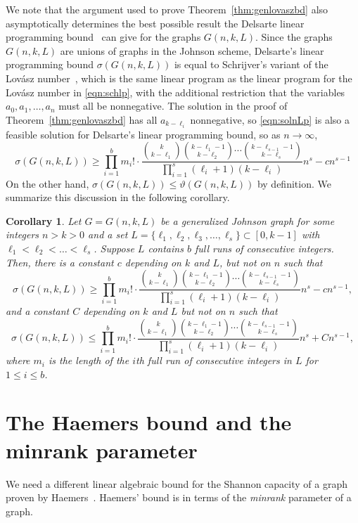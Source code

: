 \documentclass[11pt]{article}
\newtheorem{corollary}[theorem]{Corollary}
\theoremstyle{definition}
\theoremstyle{remark}
\begin{document}
We note that the argument used to prove Theorem~\ref{thm:genlovaszbd} also asymptotically determines the best possible result the Delsarte linear programming bound~\cite{Del1973, Sch1979} can give for the graphs $G(n, k, L)$. Since the graphs $G(n, k, L)$ are unions of graphs in the Johnson scheme, Delsarte's linear programming bound $\sigma(G(n, k, L))$ is equal to Schrijver's variant of the Lov\'asz number~\cite{Sch1979}, which is the same linear program as the linear program for the Lov\'asz number in \eqref{eqn:schlp}, with the additional restriction that the variables $a_{0}, a_{1}, \ldots, a_{n}$ must all be nonnegative. The solution in the proof of Theorem~\ref{thm:genlovaszbd} has all $a_{k-\ell_i}$ nonnegative, so \eqref{eqn:solnLp} is also a feasible solution for Delsarte's linear programming bound, so as $n\rightarrow\infty$,
\[\sigma(G(n, k, L)) \ge \prod_{i=1}^{b}m_i!\cdot\frac{\binom{k}{k-\ell_1}\binom{k-\ell_1-1}{k-\ell_2}\cdots \binom{k-\ell_{s-1}-1}{k-\ell_s}}{\prod_{i=1}^s(\ell_i+1)(k-\ell_i)}n^s - cn^{s-1}\]
On the other hand, $\sigma(G(n, k, L)) \le \vartheta(G(n, k, L))$ by definition. We summarize this discussion in the following corollary. 

\begin{corollary}\label{cor:delsartelp}
Let $G = G(n, k, L)$ be a generalized Johnson graph for some integers $n > k > 0$ and a set $L = \{\ell_1, \ell_2, \ell_3, \ldots, \ell_s\} \subset [0, k-1]$ with $\ell_1 < \ell_2 < \ldots < \ell_s$. Suppose $L$ contains $b$ full runs of consecutive integers. Then, there is a constant $c$ depending on $k$ and $L$, but not on $n$ such that 
\[\sigma(G(n, k, L))\ge \prod_{i=1}^{b}m_i!\cdot\frac{\binom{k}{k-\ell_1}\binom{k-\ell_1-1}{k-\ell_2}\cdots \binom{k-\ell_{s-1}-1}{k-\ell_s}}{\prod_{i=1}^s(\ell_i+1)(k-\ell_i)}n^s -cn^{s-1} ,\]
and a constant $C$ depending on $k$ and $L$ but not on $n$ such that
\[\sigma(G(n, k, L))\le \prod_{i=1}^{b}m_i!\cdot\frac{\binom{k}{k-\ell_1}\binom{k-\ell_1-1}{k-\ell_2}\cdots \binom{k-\ell_{s-1}-1}{k-\ell_s}}{\prod_{i=1}^s(\ell_i+1)(k-\ell_i)}n^s +Cn^{s-1},\]
where $m_i$ is the length of the $i$th full run of consecutive integers in $L$ for $1\le i\le b$. 
\end{corollary}

\section{The Haemers bound and the minrank parameter}

We need a different linear algebraic bound for the Shannon capacity of a graph proven by Haemers~\cite{Haem1978, Haem1979}. Haemers' bound is in terms of the \textit{minrank} parameter of a graph. 
\end{document}
